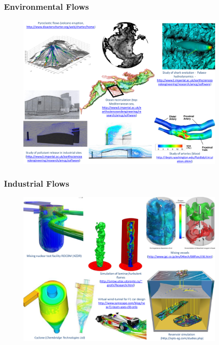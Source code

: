 \documentclass[10pt,compress,handout,ignorenonframetext]{beamer}
\begin{document}
\begin{frame}
 \frametitle{Environmental Flows} 

   \begin{figure}%
    \begin{center}
     \includegraphics[width=12.cm, height=7.8cm, clip]{./Figs/EnvironmentallApplications.pdf}
    \end{center}
   \end{figure}    

\end{frame}

\begin{frame}
 \frametitle{Industrial Flows} 

   \begin{figure}%
    \begin{center}
     \includegraphics[width=12.cm, height=7.8cm, clip]{./Figs/IndustrialApplications.pdf}
    \end{center}
   \end{figure}    

\end{frame}
\end{document}
